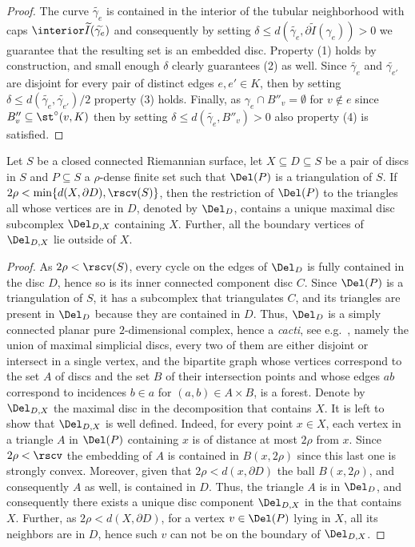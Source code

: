 \begin{proof}
    The curve $\widetilde{\gamma_e}$ is contained in the interior of the tubular neighborhood with caps $\interior\widetilde{I}(\widetilde{\gamma_e})$ and consequently by setting $\delta \leq d(\widetilde{\gamma_e},\partial \widetilde{I}(\gamma_e)) > 0$ we guarantee that the resulting set is an embedded disc. Property (1) holds by construction, and small enough $\delta$ clearly guarantees (2) as well. 
%
    Since $\widetilde{\gamma_e}$ and $\widetilde{\gamma_{e'}}$ are disjoint for every pair of distinct edges $e,e'\in K$, then by setting $\delta 
    \leq d(\widetilde{\gamma_e},\widetilde{\gamma_{e'}})/2$ property (3) holds. 
%
    Finally, as $\gamma_e \cap B''_v = \emptyset$ for $v\notin e$ since $B''_v\subseteq \st^\circ(v,K)$ then by setting $\delta \leq d(\widetilde{\gamma_e},B''_v)>0$ also property (4) is satisfied.
\end{proof}
%
\begin{lemma}
    \label{l:del-neigh}
    Let $S$ be a closed connected Riemannian surface, 
    let $X \subseteq D\subseteq S$ be a pair of discs in $S$ and $P\subseteq S$ a $\rho$-dense finite set such that $\Del(P)$ is a triangulation of $S$. 
    If $2\rho < \min \{d(X,\partial D), \rscv(S) \}$, then the restriction of $\Del(P)$ to the triangles all whose vertices are in $D$, denoted by $\Del_D$, 
    contains a unique maximal disc subcomplex $\Del_{D,X}$ containing $X$. Further, all the boundary vertices of $\Del_{D,X}$ lie outside of $X$.
\end{lemma}
%
\begin{proof}
As $2\rho < \rscv(S)$,
every cycle on the edges of $\Del_D$ is fully contained in the disc $D$,
hence so is its inner connected component disc $C$. Since $\Del(P)$ is a triangulation of $S$, it has a subcomplex that triangulates $C$, and its triangles are present in $\Del_D$ because they are contained in $D$.
Thus, $\Del_D$ is a simply connected planar pure $2$-dimensional complex, hence a \emph{cacti}, see e.g.~\cite{cacti-cohen2002homotopy}, namely the union of maximal simplicial discs, every two of them are either disjoint or intersect in a single vertex, and the bipartite graph whose vertices correspond to the set $A$ of discs and the set $B$ of their intersection points and whose edges $ab$ correspond to incidences $b\in a$ for $(a,b)\in A\times B$, is a forest.
%
Denote by $\Del_{D,X}$ the maximal disc in the  decomposition that contains $X$. 
It is left to show that $\Del_{D,X}$ is well defined. Indeed, for every point 
$x\in X$, each vertex in a triangle $A$ in $\Del(P)$ containing $x$ is of distance at most $2\rho$ from $x$. Since $2\rho <\rscv$ the embedding of $A$ is contained in $B(x,2\rho)$ since this last one is strongly convex. Moreover, given that $2\rho < d(x,\partial D)$ the ball $B(x,2\rho)$, and consequently $A$ as well, is contained in $D$. Thus, the triangle $A$ is in $\Del_D$, and consequently there exists a unique disc component $\Del_{D,X}$ in the  that contains $X$. 
%
Further, as $2\rho < d(X,\partial D)$, for a vertex $v\in\Del(P)$ lying in $X$, all its neighbors are in $D$, hence such $v$ can not be on the boundary of $\Del_{D,X}$.
\end{proof}

